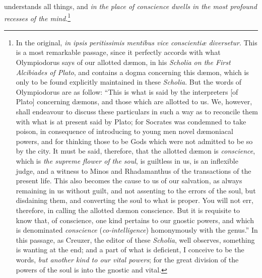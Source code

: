 \documentclass[twoside]{article}
\begin{document}
understands all things, and \textit{in the place of conscience dwells in the
most profound recesses of the mind}.\footnote{In the original, \textit{in ipsis
peritissimis mentibus vice conscienti{\ae} diversetur}. This is a most
remarkable passage, since it perfectly accords with what Olympiodorus says of
our allotted d{\ae}mon, in his \textit{Scholia on the First Alcibiades of
Plato}, and contains a dogma concerning this d{\ae}mon, which is only to be
found explicitly maintained in these \textit{Scholia}. But the words of
Olympiodorus are as follow: ``This is what is said by the interpreters [of
Plato] concerning d{\ae}mons, and those which are allotted to us. We, however,
shall endeavour to discuss these particulars in such a way as to reconcile them
with what is at present said by Plato; for Socrates was condemned to take
poison, in consequence of introducing to young men novel d{\ae}moniacal powers,
and for thinking those to be Gods which were not admitted to be so by the city.
It must be said, therefore, that the allotted d{\ae}mon is \textit{conscience},
which is \textit{the supreme flower of the soul}, is guiltless in us, is an
inflexible judge, and a witness to Minos and Rhadamanthus of the transactions
of the present life. This also becomes the cause to us of our salvation, as
always remaining in us without guilt, and not assenting to the errors of the
soul, but disdaining them, and converting the soul to what is proper. You will
not err, therefore, in calling the allotted d{\ae}mon conscience. But it is
requisite to know that, of conscience, one kind pertains to our gnostic powers,
and which is denominated \textit{conscience} (\textit{co-intelligence})
homonymously with the genus.'' In this passage, as Creuzer, the editor of these
\textit{Scholia}, well observes, something is wanting at the end; and a part of
what is deficient, I conceive to be the words, \textit{but another kind to our
vital powers}; for the great division of the powers of the soul is into the
gnostic and vital.

}
\end{document}
